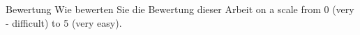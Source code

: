 \documentclass{tubsartcl}
\begin{document}
{\newpage

\begin{question}{Bewertung}\QuestionIndicative
{}
Wie bewerten Sie die Bewertung dieser Arbeit on a scale from 0 (very  -
difficult) to 5
(very easy).
\begin{choiceshoriz}[o]
\end{choiceshoriz}
\end{question}


\clearpage    

}   
\end{document}

